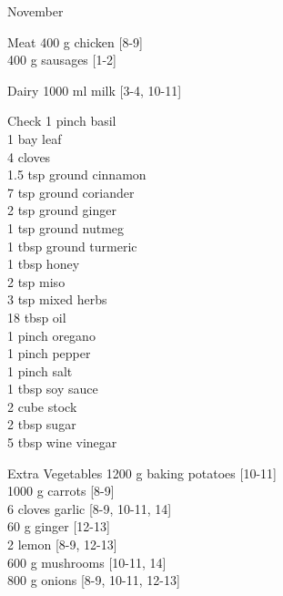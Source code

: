 \begin{menu}{November}
      \begin{shoppinglist}{Meat}
      400 g chicken {\scriptsize[8-9]}\\
      400 g sausages {\scriptsize[1-2]}\\
      \end{shoppinglist}%
      \begin{shoppinglist}{Dairy}
      1000 ml milk {\scriptsize[3-4, 10-11]}\\
      \end{shoppinglist}%
      \par\vfil %
      \vfil\clearpage %
      \begin{shoppinglist}{Check}
      1 pinch basil \\
      1  bay leaf \\
      4  cloves \\
      1.5 tsp ground cinnamon \\
      7 tsp ground coriander \\
      2 tsp ground ginger \\
      1 tsp ground nutmeg \\
      1 tbsp ground turmeric \\
      1 tbsp honey \\
      2 tsp miso \\
      3 tsp mixed herbs \\
      18 tbsp oil \\
      1 pinch oregano \\
      1 pinch pepper \\
      1 pinch salt \\
      1 tbsp soy sauce \\
      2 cube stock \\
      2 tbsp sugar \\
      5 tbsp wine vinegar \\
      \end{shoppinglist}%
      \begin{shoppinglist}{Extra Vegetables}
      1200 g baking potatoes {\scriptsize[10-11]}\\
      1000 g carrots {\scriptsize[8-9]}\\
      6 cloves garlic {\scriptsize[8-9, 10-11, 14]}\\
      60 g ginger {\scriptsize[12-13]}\\
      2  lemon {\scriptsize[8-9, 12-13]}\\
      600 g mushrooms {\scriptsize[10-11, 14]}\\
      800 g onions {\scriptsize[8-9, 10-11, 12-13]}\\
      \end{shoppinglist}%
      \par\vfil %
    \vfil\clearpage
  

\end{menu}
